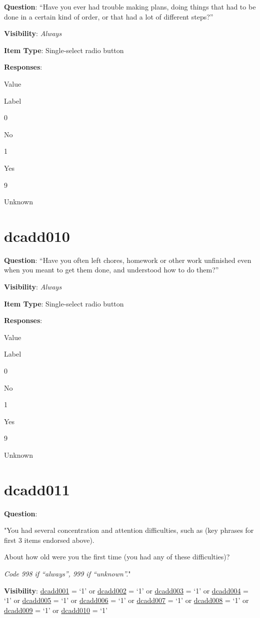 \documentclass[]{book}
\begin{document}
\textbf{Question}: ``Have you ever had trouble making plans, doing things that had to be done in a certain kind of order, or that had a lot of different steps?''

\textbf{Visibility}: \emph{Always}

\textbf{Item Type}: Single-select radio button

\textbf{Responses}:

Value

Label

0

No

1

Yes

9

Unknown

\hypertarget{dcadd010}{%
\section{dcadd010}\label{dcadd010}}

\textbf{Question}: ``Have you often left chores, homework or other work unfinished even when you meant to get them done, and understood how to do them?''

\textbf{Visibility}: \emph{Always}

\textbf{Item Type}: Single-select radio button

\textbf{Responses}:

Value

Label

0

No

1

Yes

9

Unknown

\hypertarget{dcadd011}{%
\section{dcadd011}\label{dcadd011}}

\textbf{Question}:

"You had several concentration and attention difficulties, such as (key phrases for first 3 items endorsed above).

About how old were you the first time (you had any of these difficulties)?

\emph{Code 998 if ``always'', 999 if ``unknown''.}"

\textbf{Visibility}: \protect\hyperlink{dcadd001}{dcadd001} = `1' or \protect\hyperlink{dcadd002}{dcadd002} = `1' or \protect\hyperlink{dcadd003}{dcadd003} = `1' or \protect\hyperlink{dcadd004}{dcadd004} = `1' or \protect\hyperlink{dcadd005}{dcadd005} = `1' or \protect\hyperlink{dcadd006}{dcadd006} = `1' or \protect\hyperlink{dcadd007}{dcadd007} = `1' or \protect\hyperlink{dcadd008}{dcadd008} = `1' or \protect\hyperlink{dcadd009}{dcadd009} = `1' or \protect\hyperlink{dcadd010}{dcadd010} = `1'
\end{document}
